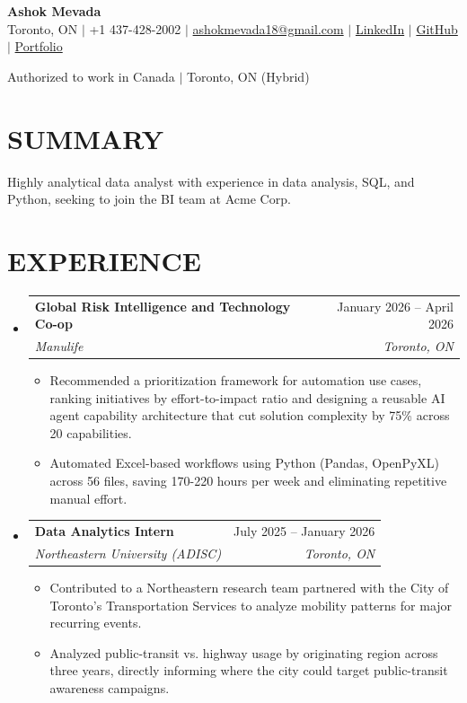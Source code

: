 \documentclass[letterpaper,11pt]{article}
\makeatletter
\newcommand{\resumeItem}[1]{\item{#1 \vspace{-2pt}}}
\newcommand{\resumeSubheading}[4]{
  \vspace{-2pt}\item
    \begin{tabular*}{0.97\textwidth}[t]{l@{\extracolsep{\fill}}r}
      \textbf{#1} & #2 \\
      \textit{#3} & \textit{#4} \\
    \end{tabular*}\vspace{-7pt}
}
\newcommand{\resumeSubHeadingListStart}{\begin{itemize}[leftmargin=0pt, label={}]}
\newcommand{\resumeSubHeadingListEnd}{\end{itemize}}
\newcommand{\resumeItemListStart}{\begin{itemize}[leftmargin=0.2in, label={$\bullet$}]}
\newcommand{\resumeItemListEnd}{\end{itemize}\vspace{-5pt}}
\makeatother
\begin{document}
\begin{center}
    {\Huge \textbf{Ashok Mevada}} \\[6pt]
    Toronto, ON $|$ +1 437-428-2002 $|$ \href{mailto:ashokmevada18@gmail.com}{ashokmevada18@gmail.com} $|$ \href{https://linkedin.com/in/ashokmevada}{LinkedIn} $|$ \href{https://github.com/Ashokmevada}{GitHub} $|$ \href{https://ashokmevada.online}{Portfolio}
\end{center}

\begin{center}
    \small Authorized to work in Canada $|$ Toronto, ON (Hybrid)
\end{center}

\section*{\MakeUppercase{Summary}}
Highly analytical data analyst with experience in data analysis, SQL, and Python, seeking to join the BI team at Acme Corp.

\section{\MakeUppercase{Experience}}
\resumeSubHeadingListStart
\resumeSubheading
  {Global Risk Intelligence and Technology Co-op}{January 2026 -- April 2026}
  {Manulife}{Toronto, ON}
\resumeItemListStart
  \resumeItem{Recommended a prioritization framework for automation use cases, ranking initiatives by effort-to-impact ratio and designing a reusable AI agent capability architecture that cut solution complexity by 75\% across 20 capabilities.}
  \resumeItem{Automated Excel-based workflows using Python (Pandas, OpenPyXL) across 56 files, saving 170-220 hours per week and eliminating repetitive manual effort.}
\resumeItemListEnd
\resumeSubheading
  {Data Analytics Intern}{July 2025 -- January 2026}
  {Northeastern University (ADISC)}{Toronto, ON}
\resumeItemListStart
  \resumeItem{Contributed to a Northeastern research team partnered with the City of Toronto's Transportation Services to analyze mobility patterns for major recurring events.}
  \resumeItem{Analyzed public-transit vs. highway usage by originating region across three years, directly informing where the city could target public-transit awareness campaigns.}
\resumeItemListEnd
\resumeSubHeadingListEnd
\end{document}
